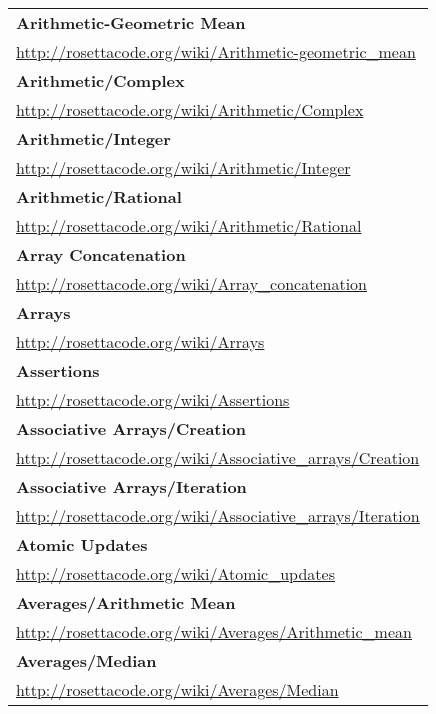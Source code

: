 \begin{longtable}{l}
\textbf{Arithmetic-Geometric Mean } \\ \href{http://rosettacode.org/wiki/Arithmetic-geometric\_mean}{http://rosettacode.org/wiki/Arithmetic-geometric\_mean} \\
\textbf{
Arithmetic/Complex } \\ \href{http://rosettacode.org/wiki/Arithmetic/Complex}{http://rosettacode.org/wiki/Arithmetic/Complex} \\
\textbf{Arithmetic/Integer } \\ \href{http://rosettacode.org/wiki/Arithmetic/Integer}{http://rosettacode.org/wiki/Arithmetic/Integer} \\
\textbf{Arithmetic/Rational } \\ \href{http://rosettacode.org/wiki/Arithmetic/Rational}{http://rosettacode.org/wiki/Arithmetic/Rational} \\
\textbf{
Array Concatenation } \\ \href{http://rosettacode.org/wiki/Array\_concatenation}{http://rosettacode.org/wiki/Array\_concatenation} \\
\textbf{Arrays } \\ \href{http://rosettacode.org/wiki/Arrays}{http://rosettacode.org/wiki/Arrays} \\
\textbf{Assertions } \\ \href{http://rosettacode.org/wiki/Assertions}{http://rosettacode.org/wiki/Assertions} \\
\textbf{
Associative Arrays/Creation } \\ \href{http://rosettacode.org/wiki/Associative\_arrays/Creation}{http://rosettacode.org/wiki/Associative\_arrays/Creation} \\
\textbf{Associative Arrays/Iteration } \\ \href{http://rosettacode.org/wiki/Associative\_arrays/Iteration}{http://rosettacode.org/wiki/Associative\_arrays/Iteration} \\
\textbf{
Atomic Updates } \\ \href{http://rosettacode.org/wiki/Atomic\_updates}{http://rosettacode.org/wiki/Atomic\_updates} \\
\textbf{Averages/Arithmetic Mean } \\ \href{http://rosettacode.org/wiki/Averages/Arithmetic\_mean}{http://rosettacode.org/wiki/Averages/Arithmetic\_mean} \\
\textbf{Averages/Median } \\ \href{http://rosettacode.org/wiki/Averages/Median}{http://rosettacode.org/wiki/Averages/Median} \\

\end{longtable}
